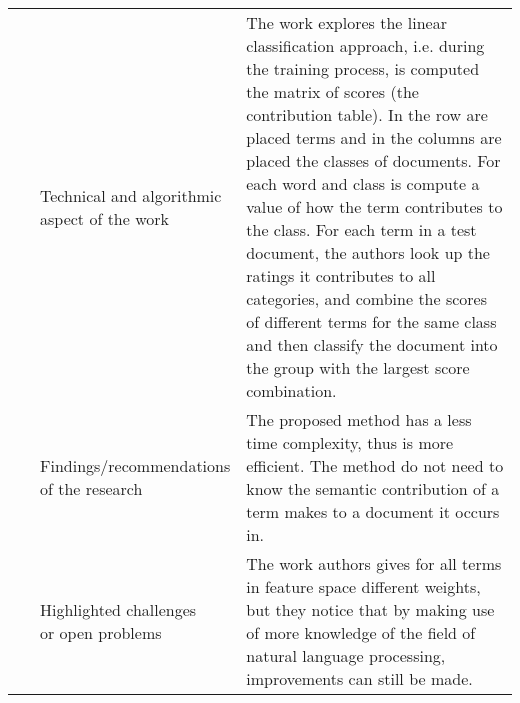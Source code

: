 \begin{landscape}
\begin{longtable}{lp{}p{}}
	\multirow{3}[0]{*}{~\citep{Xia2009}} & 
    \specialcell{Technical and algorithmic \\ aspect of the work} &
    The work explores the linear classification approach, i.e. during the training process, is computed the matrix of scores (the contribution table). In the row are placed terms and in the columns are placed the classes of documents. For each word and class is compute a value of how the term contributes to the class. For each term in a test document, the authors look up the ratings it contributes to all categories, and combine the scores of different terms for the same class and then classify the document into the group with the largest score combination.  
    \\ & 
    \specialcell{Findings/recommendations \\ of the research} & 
	The proposed method has a less time complexity, thus is more efficient. The method do not need to know the semantic contribution of a term makes to a document it occurs in.
    \\ & 
    \specialcell{Highlighted challenges \\ or open problems} & 
	The work authors gives for all terms in feature space different weights, but they notice that by making use of more knowledge of the field of natural language processing, improvements can still be made. 
	\\
	

\end{longtable}
\end{landscape}
